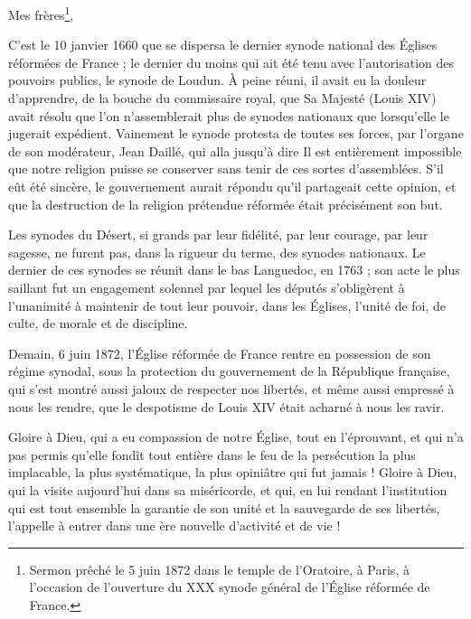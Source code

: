 \addchap{}

Mes frères\footnote{Sermon prêché le 5 juin 1872 dans le temple de l’Oratoire, à Paris, à l’occasion de l'ouverture du XXX synode général de l'Église réformée de France.},

C’est le 10 janvier 1660 que se dispersa le dernier synode national des Églises réformées de France ; le dernier du moins qui ait été tenu avec l’autorisation des pouvoirs publics, le synode de Loudun. À peine réuni, il avait eu la douleur d’apprendre, de la bouche du commissaire royal, que Sa Majesté (Louis XIV) avait résolu \Og{} que l’on n’assemblerait plus de synodes nationaux que lorsqu’elle le jugerait expédient\Fg{}. Vainement le synode protesta de toutes ses forces, par l’organe de son modérateur, Jean Daillé, qui alla jusqu’à dire\frcolon{} \Og{} Il est entièrement impossible que notre religion puisse se conserver sans tenir de ces sortes d’assemblées.\Fg{} S’il eût été sincère, le gouvernement aurait répondu qu’il partageait cette opinion, et que la destruction de la religion \Og{} prétendue réformée\Fg{} était précisément son but.

Les synodes du Désert, si grands par leur fidélité, par leur courage, par leur sagesse, ne furent pas, dans la rigueur du terme, des synodes nationaux. Le dernier de ces synodes se réunit dans le bas Languedoc, en 1763 ; son acte le plus saillant fut un engagement solennel par lequel les députés s’obligèrent à l’unanimité à maintenir de tout leur pouvoir, dans les Églises, l’unité de foi, de culte, de morale et de discipline.

Demain, 6 juin 1872, l’Église réformée de France rentre en possession de son régime synodal, sous la protection du gouvernement de la République française, qui s’est montré aussi jaloux de respecter nos libertés, et même aussi empressé à nous les rendre, que le despotisme de Louis XIV était acharné à nous les ravir.

Gloire à Dieu, qui a eu compassion de notre Église, tout en l’éprouvant, et qui n’a pas permis qu’elle fondît tout entière dans le feu de la persécution la plus implacable, la plus systématique, la plus opiniâtre qui fut jamais ! Gloire à Dieu, qui la visite aujourd’hui dans sa miséricorde, et qui, en lui rendant l’institution qui est tout ensemble la garantie de son unité et la sauvegarde de ses libertés, l’appelle à entrer dans une ère nouvelle d’activité et de vie !

